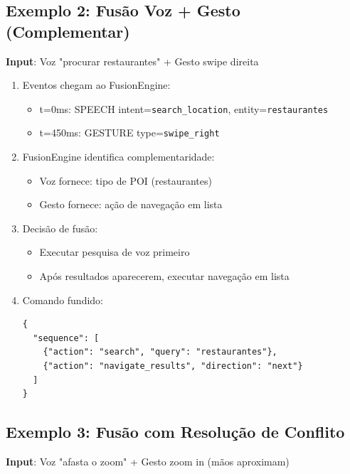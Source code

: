 \subsection{Exemplo 2: Fusão Voz + Gesto (Complementar)}

\textbf{Input}: Voz "procurar restaurantes" + Gesto swipe direita

\begin{enumerate}
    \item Eventos chegam ao FusionEngine:
    \begin{itemize}
        \item t=0ms: SPEECH intent=\texttt{search\_location}, entity=\texttt{restaurantes}
        \item t=450ms: GESTURE type=\texttt{swipe\_right}
    \end{itemize}

    \item FusionEngine identifica complementaridade:
    \begin{itemize}
        \item Voz fornece: tipo de POI (restaurantes)
        \item Gesto fornece: ação de navegação em lista
    \end{itemize}

    \item Decisão de fusão:
    \begin{itemize}
        \item Executar pesquisa de voz primeiro
        \item Após resultados aparecerem, executar navegação em lista
    \end{itemize}

    \item Comando fundido:
    \begin{verbatim}
{
  "sequence": [
    {"action": "search", "query": "restaurantes"},
    {"action": "navigate_results", "direction": "next"}
  ]
}
    \end{verbatim}
\end{enumerate}

\subsection{Exemplo 3: Fusão com Resolução de Conflito}

\textbf{Input}: Voz "afasta o zoom" + Gesto zoom in (mãos aproximam)

